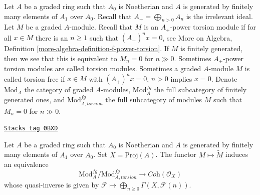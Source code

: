 Let $A$ be a graded ring such that $A_0$ is Noetherian and $A$ is generated
by finitely many elements of $A_1$ over $A_0$. Recall that
$A_+ = \bigoplus_{n > 0} A_n$ is the irrelevant ideal.
Let $M$ be a graded $A$-module. Recall that
$M$ is an $A_+$-power torsion module if for all $x \in M$
there is an $n \geq 1$ such that $(A_+)^n x = 0$, see
More on Algebra, Definition \ref{more-algebra-definition-f-power-torsion}.
If $M$ is finitely generated, then we see that
this is equivalent to $M_n = 0$ for $n \gg 0$.
Sometimes $A_+$-power torsion modules are called torsion modules.
Sometimes a graded $A$-module $M$ is called torsion free if
$x \in M$ with $(A_+)^n x = 0$, $n > 0$ implies $x = 0$.
Denote $\text{Mod}_A$ the category of graded $A$-modules,
$\text{Mod}^{fg}_A$ the full subcategory of finitely generated ones,
and $\text{Mod}^{fg}_{A, torsion}$ the full subcategory of
modules $M$ such that $M_n = 0$ for $n \gg 0$.

\begin{proposition}
\label{coherent-proposition-coherent-modules-on-proj}
\href{https://stacks.math.columbia.edu/tag/0BXD}{\texttt{Stacks tag 0BXD}}

Let $A$ be a graded ring such that $A_0$ is Noetherian and $A$ is generated
by finitely many elements of $A_1$ over $A_0$.
Set $X = \text{Proj}(A)$. The functor $M \mapsto \widetilde M$
induces an equivalence
$$
\text{Mod}^{fg}_A/\text{Mod}^{fg}_{A, torsion}
\longrightarrow
\textit{Coh}(\mathcal{O}_X)
$$
whose quasi-inverse is given by
$\mathcal{F} \longmapsto \bigoplus_{n \geq 0} \Gamma(X, \mathcal{F}(n))$.
\end{proposition}

